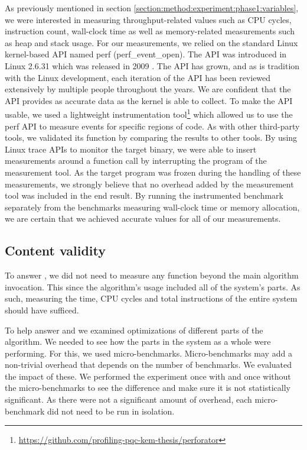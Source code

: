 As previously mentioned in section \ref{section:method:experiment:phase1:variables}, we were interested in measuring throughput-related values such as CPU cycles, instruction count, wall-clock time as well as memory-related measurements such as heap and stack usage. For our measurements, we relied on the standard Linux kernel-based API named perf (perf\_event\_open). The API was introduced in Linux 2.6.31 which was released in 2009 \cite{linux:perf-released}. The API has grown, and as is tradition with the Linux development, each iteration of the API has been reviewed extensively by multiple people throughout the years. We are confident that the API provides as accurate data as the kernel is able to collect. To make the API usable, we used a lightweight instrumentation tool\footnote{\url{https://github.com/profiling-pqc-kem-thesis/perforator}} which allowed us to use the perf API to measure events for specific regions of code. As with other third-party tools, we validated its function by comparing the results to other tools. By using Linux trace APIs to monitor the target binary, we were able to insert measurements around a function call by interrupting the program of the measurement tool. As the target program was frozen during the handling of these measurements, we strongly believe that no overhead added by the measurement tool was included in the end result. By running the instrumented benchmark separately from the benchmarks measuring wall-clock time or memory allocation, we are certain that we achieved accurate values for all of our measurements.

\subsection{Content validity}


To answer , we did not need to measure any function beyond the main algorithm invocation. This since the algorithm's usage included all of the system's parts. As such, measuring the time, CPU cycles and total instructions of the entire system should have sufficed.

To help answer  and  we examined optimizations of different parts of the algorithm. We needed to see how the parts in the system as a whole were performing. For this, we used micro-benchmarks. Micro-benchmarks may add a non-trivial overhead that depends on the number of benchmarks. We evaluated the impact of these. We performed the experiment once with and once without the micro-benchmarks to see the difference and make sure it is not statistically significant. As there were not a significant amount of overhead, each micro-benchmark did not need to be run in isolation.

